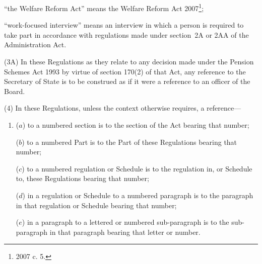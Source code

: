 \documentclass[12pt,a4paper]{article}
\begin{document}
\begin{enumerate}
“the Welfare Reform Act” means the Welfare Reform Act 2007\footnote{2007 c. 5.};



“work-focused interview” means an interview in which a person is required to take part in accordance with regulations made under section~2A or 2AA of the Administration Act.

\end{enumerate}

(3A) In these Regulations as they relate to any decision made under the Pension Schemes Act 1993 by virtue of section 170(2) of that Act, any reference to the Secretary of State is to be construed as if it were a reference to an officer of the Board.

(4) In these Regulations, unless the context otherwise requires, a reference—
\begin{enumerate}\item[]
($a$) to a numbered section is to the section of the Act bearing that number;

($b$) to a numbered Part is to the Part of these Regulations bearing that number;

($c$) to a numbered regulation or Schedule is to the regulation in, or Schedule to, these Regulations bearing that number;

($d$) in a regulation or Schedule to a numbered paragraph is to the paragraph in that regulation or Schedule bearing that number;

($e$) in a paragraph to a lettered or numbered sub-paragraph is to the sub-paragraph in that paragraph bearing that letter or number.
\end{enumerate}
\end{document}
